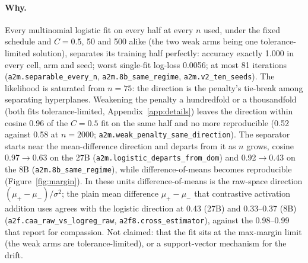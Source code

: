 \documentclass[11pt]{article}
\newcommand{\rid}[1]{{\footnotesize\texttt{#1}}}
\begin{document}
\paragraph{Why.} Every multinomial logistic fit on every half at every $n$ used, under the fixed schedule and $C = 0.5$, 50 and 500 alike (the two weak arms being one tolerance-limited solution), separates its training half perfectly: accuracy exactly 1.000 in every cell, arm and seed; worst single-fit log-loss 0.0056; at most 81 iterations (\rid{a2m.separable\_every\_n}, \rid{a2m.8b\_same\_regime}, \rid{a2m.v2\_ten\_seeds}). The likelihood is saturated from $n=75$: the direction is the penalty's tie-break among separating hyperplanes. Weakening the penalty a hundredfold or a thousandfold (both fits tolerance-limited, Appendix~\ref{app:details}) leaves the direction within cosine 0.96 of the $C=0.5$ fit on the same half and no more reproducible (0.52 against 0.58 at $n=2000$; \rid{a2m.weak\_penalty\_same\_direction}). The separator starts near the mean-difference direction and departs from it as $n$ grows, cosine 0.97$\to$0.63 on the 27B (\rid{a2m.logistic\_departs\_from\_dom}) and 0.92$\to$0.43 on the 8B (\rid{a2m.8b\_same\_regime}), while difference-of-means becomes reproducible (Figure~\ref{fig:margin}). In these units difference-of-means is the raw-space direction $(\mu_+-\mu_-)/\sigma^2$; the plain mean difference $\mu_+-\mu_-$ that contrastive activation addition uses agrees with the logistic direction at 0.43 (27B) and 0.33--0.37 (8B) (\rid{a2f.caa\_raw\_vs\_logreg\_raw}, \rid{a2f8.cross\_estimator}), against the 0.98--0.99 that \citet{herbster2026steering} report for compassion. Not claimed: that the fit sits at the max-margin limit (the weak arms are tolerance-limited), or a support-vector mechanism for the drift.
\end{document}
